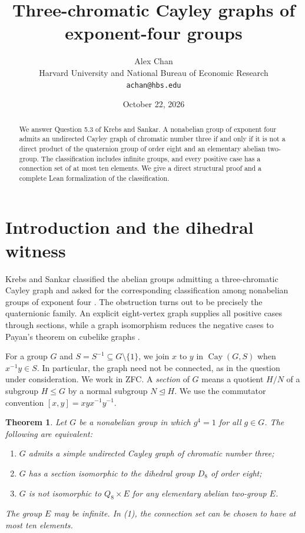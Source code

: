 \documentclass[11pt]{article}
\title{Three-chromatic Cayley graphs of exponent-four groups}
\author{Alex Chan\\[2pt]
  \small Harvard University and National Bureau of Economic Research\\[-1pt]
  \small \texttt{achan@hbs.edu}}
\date{October 22, 2026}
\newtheorem{theorem}{Theorem}
\newcommand{\Cay}{\operatorname{Cay}}
\begin{document}
\maketitle

\begin{abstract}
We answer Question 5.3 of Krebs and Sankar. A nonabelian group of
exponent four admits an undirected Cayley graph of chromatic number three
if and only if it is not a direct product of the quaternion group of order
eight and an elementary abelian two-group. The classification includes
infinite groups, and every positive case has a connection set of at most
ten elements. We give a direct structural proof and a complete Lean
formalization of the classification.
\end{abstract}

\section{Introduction and the dihedral witness}

Krebs and Sankar classified the abelian groups admitting a three-chromatic
Cayley graph and asked for the corresponding classification among
nonabelian groups of exponent four \cite[Question~5.3]{KrebsSankar}.
The obstruction turns out to be precisely the quaternionic family.
An explicit eight-vertex graph supplies all positive cases through
sections, while a graph isomorphism reduces the negative cases to
Payan's theorem on cubelike graphs \cite{Payan}.


For a group $G$ and $S=S^{-1}\subseteq G\setminus\{1\}$, we join $x$ to
$y$ in $\Cay(G,S)$ when $x^{-1}y\in S$. In particular, the graph need not
be connected, as in the question under consideration. We work in ZFC.
A \emph{section} of $G$ means a quotient $H/N$ of a subgroup $H\leq G$
by a normal subgroup $N\trianglelefteq H$. We use the commutator convention
$[x,y]=xyx^{-1}y^{-1}$.

\begin{theorem}\label{thm:main}
Let $G$ be a nonabelian group in which $g^4=1$ for all $g\in G$.
The following are equivalent:
\begin{enumerate}
\item $G$ admits a simple undirected Cayley graph of chromatic number three;
\item $G$ has a section isomorphic to the dihedral group $D_8$ of order eight;
\item $G$ is not isomorphic to $Q_8\times E$ for any elementary abelian
two-group $E$.
\end{enumerate}
The group $E$ may be infinite. In (1), the connection set can be chosen to
have at most ten elements.
\end{theorem}
\end{document}
